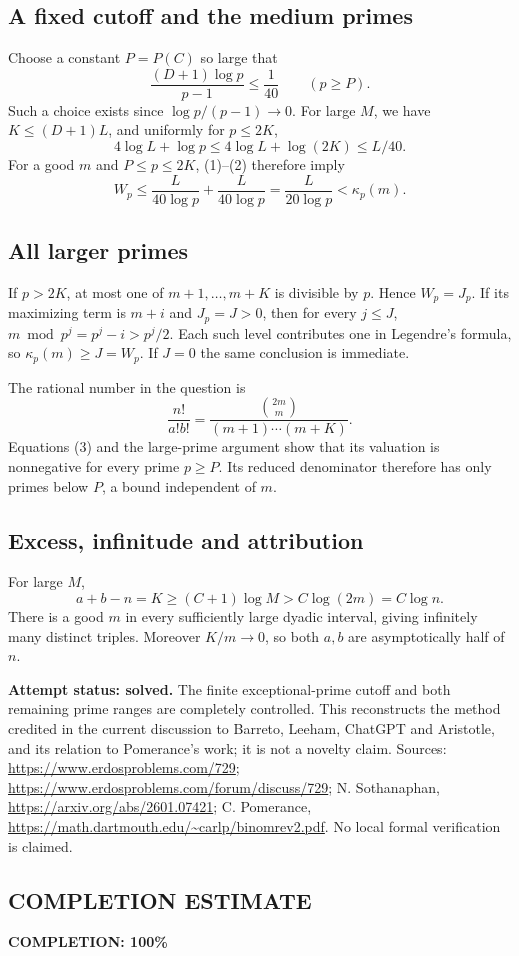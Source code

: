 \subsection*{A fixed cutoff and the medium primes}
Choose a constant $P=P(C)$ so large that
\[
 \frac{(D+1)\log p}{p-1}\leq\frac1{40}\qquad(p\geq P).
\]
Such a choice exists since $\log p/(p-1)\to0$.
For large $M$, we have $K\leq(D+1)L$, and uniformly for $p\leq2K$,
\[
 4\log L+\log p\leq4\log L+\log(2K)\leq L/40.
\]
For a good $m$ and $P\leq p\leq2K$, (1)--(2) therefore imply
\[
 W_p\leq\frac{L}{40\log p}+\frac{L}{40\log p}
       =\frac{L}{20\log p}
       <\kappa_p(m). \tag{3}
\]

\subsection*{All larger primes}
If $p>2K$, at most one of $m+1,\ldots,m+K$ is divisible by $p$. Hence $W_p=J_p$. If its maximizing term is $m+i$ and $J_p=J>0$, then for every $j\leq J$,
$m\bmod p^j=p^j-i>p^j/2$. Each such level contributes one in Legendre's formula, so $\kappa_p(m)\geq J=W_p$. If $J=0$ the same conclusion is immediate.

The rational number in the question is
\[
 \frac{n!}{a!b!}
 =\frac{\binom{2m}{m}}{(m+1)\cdots(m+K)}.
\]
Equations (3) and the large-prime argument show that its valuation is nonnegative for every prime $p\geq P$. Its reduced denominator therefore has only primes below $P$, a bound independent of $m$.

\subsection*{Excess, infinitude and attribution}
For large $M$,
\[
 a+b-n=K\geq(C+1)\log M>C\log(2m)=C\log n.
\]
There is a good $m$ in every sufficiently large dyadic interval, giving infinitely many distinct triples. Moreover $K/m\to0$, so both $a,b$ are asymptotically half of $n$.

\textbf{Attempt status: solved.} The finite exceptional-prime cutoff and both remaining prime ranges are completely controlled. This reconstructs the method credited in the current discussion to Barreto, Leeham, ChatGPT and Aristotle, and its relation to Pomerance's work; it is not a novelty claim.
Sources: \url{https://www.erdosproblems.com/729}; \url{https://www.erdosproblems.com/forum/discuss/729}; N. Sothanaphan, \url{https://arxiv.org/abs/2601.07421}; C. Pomerance, \url{https://math.dartmouth.edu/~carlp/binomrev2.pdf}. No local formal verification is claimed.

\subsection*{COMPLETION ESTIMATE}
\textbf{COMPLETION: 100\%}
